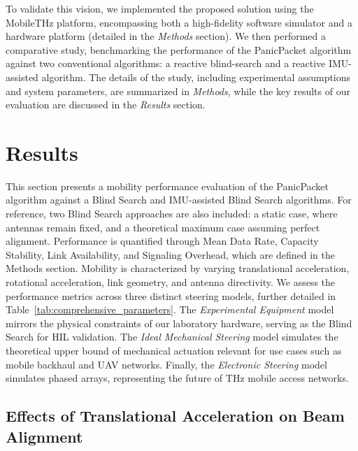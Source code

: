\documentclass[fleqn,10pt]{wlscirep}
\begin{document}
To validate this vision, we implemented the proposed solution using the MobileTHz platform, encompassing both a high-fidelity software simulator and a hardware platform (detailed in the \textit{Methods} section). We then performed a comparative study, benchmarking the performance of the PanicPacket algorithm against two conventional algorithms: a reactive blind-search and a reactive IMU-assisted algorithm. The details of the study, including experimental assumptions and system parameters, are summarized in \textit{Methods}, while the key results of our evaluation are discussed in the \textit{Results} section.


\section*{Results}

This section presents a mobility performance evaluation of the PanicPacket algorithm against a Blind Search and IMU-assisted Blind Search algorithms. For reference, two Blind Search approaches are also included: a static case, where antennas remain fixed, and a theoretical maximum case assuming perfect alignment. Performance is quantified through Mean Data Rate, Capacity Stability, Link Availability, and Signaling Overhead, which are defined in the Methods section. Mobility is characterized by varying translational acceleration, rotational acceleration, link geometry, and antenna directivity. We assess the performance metrics across three distinct steering models, further detailed in Table~\ref{tab:comprehensive_parameters}. The \textit{Experimental Equipment} model mirrors the physical constraints of our laboratory hardware, serving as the Blind Search for HIL validation. The \textit{Ideal Mechanical Steering} model simulates the theoretical upper bound of mechanical actuation relevant for use cases such as mobile backhaul and UAV networks. Finally, the \textit{Electronic Steering} model simulates phased arrays, representing the future of THz mobile access networks.

\subsection*{Effects of Translational Acceleration on Beam Alignment}
\end{document}
